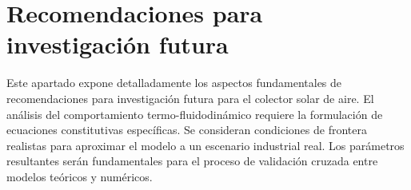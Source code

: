 \section{Recomendaciones para investigación futura}
\label{sec:cap10_recomendaciones_investigacion}

Este apartado expone detalladamente los aspectos fundamentales de recomendaciones para investigación futura para el colector solar de aire.
El análisis del comportamiento termo-fluidodinámico requiere la formulación de ecuaciones constitutivas específicas.
Se consideran condiciones de frontera realistas para aproximar el modelo a un escenario industrial real.
Los parámetros resultantes serán fundamentales para el proceso de validación cruzada entre modelos teóricos y numéricos.
